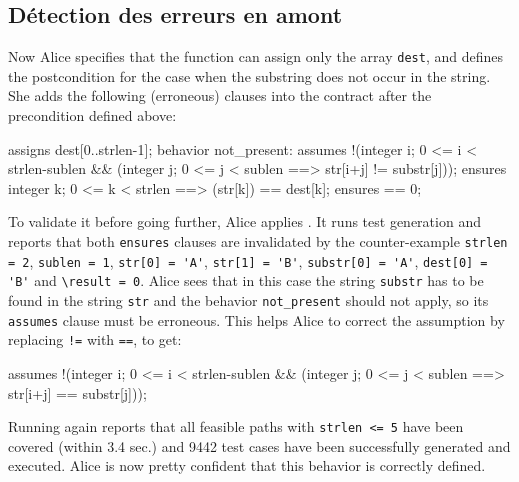 \subsection{Détection des erreurs en amont}
\label{sec:ncd-early}


Now Alice specifies that the function can assign only the array
\lstinline{dest}, and defines the postcondition for the case when the
substring does not occur in the string. She adds the following (erroneous)
clauses into the contract after the precondition defined above:
\begin{pretty-codeACSL}
assigns dest[0..strlen-1];
behavior not_present:
 assumes !(\exists integer i; 0 <= i < strlen-sublen && 
  (\forall integer j; 0 <= j < sublen ==> str[i+j] != substr[j]));
 ensures \forall integer k; 0 <= k < strlen ==> \old(str[k]) == dest[k];
 ensures \result == 0;
\end{pretty-codeACSL}
To validate it before going further, Alice applies \stady.
It runs test generation and reports that
both \lstinline{ensures} clauses are invalidated by the counter-example
\lstinline{strlen = 2}, \lstinline{sublen = 1}, \lstinline{str[0] = 'A'},
\lstinline{str[1] = 'B'}, \lstinline{substr[0] = 'A'}, 
\lstinline{dest[0] = 'B'} and \lstinline{\result = 0}.
Alice sees that in
this case the string \lstinline{substr} has to be found in the
string \lstinline{str} and the behavior \lstinline{not_present} should not
apply, so its \lstinline{assumes} clause must be erroneous.
This helps Alice to correct the assumption by replacing \lstinline{!=} with
\lstinline{==}, to get:
\begin{pretty-codeACSL}
  assumes !(\exists integer i; 0 <= i < strlen-sublen && 
   (\forall integer j; 0 <= j < sublen ==> str[i+j] == substr[j]));
\end{pretty-codeACSL}
Running \stady again reports that all feasible paths with
\lstinline{strlen <= 5} have been covered (within 3.4 sec.) and 9442 test cases
have been
successfully generated and executed. Alice is now pretty confident that this
behavior is correctly defined.


